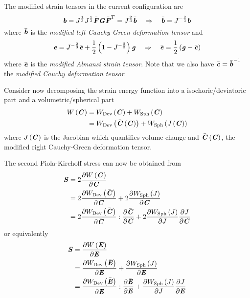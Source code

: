 The modified strain tensors in the current configuration are 
\begin{equation}
  \tensor{b} = J^{\frac{1}{3}}J^{\frac{1}{3}}\bar{\tensor{F}}\tensor{G}\transpose{\bar{\tensor{F}}}=J^{\frac{2}{3}}\bar{\tensor{b}} \quad\Rightarrow\quad \bar{\tensor{b}} =J^{-\frac{2}{3}}\tensor{b}
\end{equation}
where $\bar{\tensor{b}}$ is the \emph{modified left Cauchy-Green deformation tensor} and
\begin{equation}
  \tensor{e} =
  J^{-\frac{2}{3}}{\bar{\tensor{e}}}+\dfrac{1}{2}\pbrac{1-J^{-\frac{2}{3}}}\tensor{g}
  \quad\Rightarrow\quad \bar{\tensor{e}} = \dfrac{1}{2}\pbrac{\tensor{g}-\bar{\tensor{c}}}
\end{equation}
where $\bar{\tensor{e}}$ is the \emph{modified Almansi strain
  tensor}. Note that we also have
$\bar{\tensor{c}}=\inverse{\bar{\tensor{b}}}$ the \emph{modified Cauchy
  deformation tensor}.

Consider now decomposing the strain energy function into a
isochoric/deviatoric part and a volumetric/spherical part \ie
\begin{equation}
  \begin{split}
    \fnof{W}{\tensor{C}} &=
    \fnof{W_{\Devop}}{\tensor{C}}+\fnof{W_{\Sphop}}{\tensor{C}} \\
    &=\fnof{W_{\Devop}}{\fnof{\bar{\tensor{C}}}{\tensor{C}}}+\fnof{W_{\Sphop}}{\fnof{J}{\tensor{C}}}\\
  \end{split}
\end{equation}
where $\fnof{J}{\tensor{C}}$ is the Jacobian which quantifies volume change and
$\fnof{\bar{\tensor{C}}}{\tensor{C}}$, the modified right Cauchy-Green deformation tensor.

The second Piola-Kirchoff stress can now be obtained from
\begin{equation}
  \begin{split}
    \tensor{S} &= 2\delby{\fnof{W}{\tensor{C}}}{\tensor{C}} \\
    &=2\delby{\fnof{W_{\Devop}}{\bar{\tensor{C}}}}{\tensor{C}}+2\delby{\fnof{W_{\Sphop}}{J}}{\tensor{C}}\\
    &=2\doubledotprod{\delby{\fnof{W_{\Devop}}{\bar{\tensor{C}}}}{\bar{\tensor{C}}}}{\delby{\bar{\tensor{C}}}{\tensor{C}}}+2\delby{\fnof{W_{\Sphop}}{J}}{J}\delby{J}{\tensor{C}}
  \end{split}
\end{equation}
or equivalently
\begin{equation}
  \begin{split}
    \tensor{S} &= \delby{\fnof{W}{\tensor{E}}}{\tensor{E}} \\
    &=\delby{\fnof{W_{\Devop}}{\bar{\tensor{E}}}}{\tensor{E}}+\delby{\fnof{W_{\Sphop}}{J}}{\tensor{E}}\\
    &=\doubledotprod{\delby{\fnof{W_{\Devop}}{\bar{\tensor{E}}}}{\bar{\tensor{E}}}}{\delby{\bar{\tensor{E}}}{\tensor{E}}}+\delby{\fnof{W_{\Sphop}}{J}}{J}\delby{J}{\tensor{E}}
  \end{split}
\end{equation}

